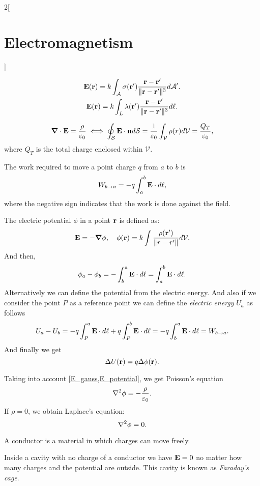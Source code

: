 \documentclass[../../../main.tex]{subfiles}
\begin{document}
\begin{multicols}{2}[\section{Electromagnetism}]
\begin{prop}
\begin{gather*}
      \boldsymbol{\mathrm{E}}(\boldsymbol{\mathrm{r}})=k\int_\mathcal{A}\sigma(\boldsymbol{\mathrm{r}}')\frac{\boldsymbol{\mathrm{r}}-\boldsymbol{\mathrm{r}}'}{\|\boldsymbol{\mathrm{r}}-\boldsymbol{\mathrm{r}}'\|^3}d\mathcal{A}'.\\
      \boldsymbol{\mathrm{E}}(\boldsymbol{\mathrm{r}})=k\int_L\lambda(\boldsymbol{\mathrm{r}}')\frac{\boldsymbol{\mathrm{r}}-\boldsymbol{\mathrm{r}}'}{\|\boldsymbol{\mathrm{r}}-\boldsymbol{\mathrm{r}}'\|^3}d\ell.
    \end{gather*}
  \end{prop}
  \begin{prop}
    \begin{equation}
      \grad\cdot\boldsymbol{\mathrm{E}}=\frac{\rho}{\varepsilon_0}\iff\oint_\mathcal{S}\boldsymbol{\mathrm{E}}\cdot\boldsymbol{\mathrm{n}}d\mathcal{S}=\frac{1}{\varepsilon_0}\int_\mathcal{V}\rho(r)d\mathcal{V}=\frac{Q_T}{\varepsilon_0},
      \label{E_gauss}
    \end{equation} where $Q_T$ is the total charge enclosed within $\mathcal{V}$.
  \end{prop}
  \begin{prop}[Work]
    The work required to move a point charge $q$ from $a$ to $b$ is $$W_{b\to a}=-q\int_a^b\boldsymbol{\mathrm{E}}\cdot d\ell,$$ where the negative sign indicates that the work is done against the field.
  \end{prop}
  \begin{prop}
    The electric potential $\phi$ in a point $\boldsymbol{\mathrm{r}}$ is defined as:
    \begin{equation}
      \boldsymbol{\mathrm{E}}=-\grad\phi,\quad\phi(\boldsymbol{\mathrm{r}})=k\int\frac{\rho(\boldsymbol{\mathrm{r}}')}{\|r-r'\|}d\mathcal{V}.
      \label{E_potential}
    \end{equation} And then, $$\phi_a-\phi_b=-\int_b^a\boldsymbol{\mathrm{E}}\cdot d\ell=\int_a^b\boldsymbol{\mathrm{E}}\cdot d\ell.$$ Alternatively we can define the potential from the electric energy.  And also if we consider the point $P$ as a reference point we can define the \textit{electric energy} $U_a$ as follows $$U_a-U_b=-q\int_P^a\boldsymbol{\mathrm{E}}\cdot d\ell+q\int_P^b\boldsymbol{\mathrm{E}}\cdot d\ell=-q\int_b^a\boldsymbol{\mathrm{E}}\cdot d\ell=W_{b\to a}.$$ And finally we get $$\Delta U(\boldsymbol{\mathrm{r}})=q\Delta\phi(\boldsymbol{\mathrm{r}}).$$
  \end{prop}
  \begin{prop}
    Taking into account \cref{E_gauss,E_potential}, we get Poisson's equation $$\laplacian\phi=-\frac{\rho}{\varepsilon_0}.$$ If $\rho=0$, we obtain Laplace's equation: $$\laplacian\phi=0.$$
  \end{prop}
  \begin{definition}
    A conductor is a material in which charges can move freely.
  \end{definition}
  \begin{prop}
    Inside a cavity with no charge of a conductor we have $\boldsymbol{\mathrm{E}}=0$ no matter how many charges and the potential are outside. This cavity is known as \textit{Faraday's cage}.
  \end{prop}

\end{multicols}
\end{document}
